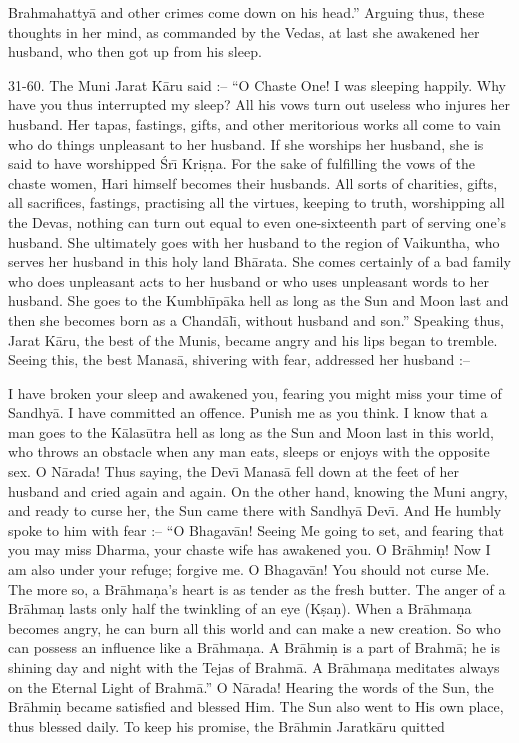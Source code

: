 Brahmahatty\=a and other crimes come down on his head.'' Arguing thus, these thoughts in her mind, as commanded by the Vedas, at last she awakened her husband, who then got up from his sleep.

31-60. The Muni Jarat K\=aru said :-- ``O Chaste One! I was sleeping happily. Why have you thus interrupted my sleep? All his vows turn out useless who injures her husband. Her tapas, fastings, gifts, and other meritorious works all come to vain who do things unpleasant to her husband. If she worships her husband, she is said to have worshipped \'Sr\={\i} Kri\d{s}\d{n}a. For the sake of fulfilling the vows of the chaste women, Hari himself becomes their husbands. All sorts of charities, gifts, all sacrifices, fastings, practising all the virtues, keeping to truth, worshipping all the Devas, nothing can turn out equal to even one-sixteenth part of serving one's husband. She ultimately goes with her husband to the region of Vaikuntha, who serves her husband in this holy land Bh\=arata. She comes certainly of a bad family who does unpleasant acts to her husband or who uses unpleasant words to her husband. She goes to the Kumbh\={\i}p\=aka hell as long as the Sun and Moon last and then she becomes born as a Chand\=al\={\i}, without husband and son.'' Speaking thus, Jarat K\=aru, the best of the Munis, became angry and his lips began to tremble. Seeing this, the best Manas\=a, shivering with fear, addressed her husband :--

I have broken your sleep and awakened you, fearing you might miss your time of Sandhy\=a. I have committed an offence. Punish me as you think. I know that a man goes to the K\=alas\=utra hell as long as the Sun and Moon last in this world, who throws an obstacle when any man eats, sleeps or enjoys with the opposite sex. O N\=arada! Thus saying, the Dev\={\i} Manas\=a fell down at the feet of her husband and cried again and again. On the other hand, knowing the Muni angry, and ready to curse her, the Sun came there with Sandhy\=a Dev\={\i}. And He humbly spoke to him with fear :-- ``O Bhagav\=an! Seeing Me going to set, and fearing that you may miss Dharma, your chaste wife has awakened you. O Br\=ahmi\d{n}! Now I am also under your refuge; forgive me. O Bhagav\=an! You should not curse Me. The more so, a Br\=ahma\d{n}a's heart is as tender as the fresh butter. The anger of a Br\=ahma\d{n} lasts only half the twinkling of an eye (K\d{s}a\d{n}). When a Br\=ahma\d{n}a becomes angry, he can burn all this world and can make a new creation. So who can possess an influence like a Br\=ahma\d{n}a. A Br\=ahmi\d{n} is a part of Brahm\=a; he is shining day and night with the Tejas of Brahm\=a. A Br\=ahma\d{n}a meditates always on the Eternal Light of Brahm\=a.'' O N\=arada! Hearing the words of the Sun, the Br\=ahmi\d{n} became satisfied and blessed Him. The Sun also went to His own place, thus blessed daily. To keep his promise, the Br\=ahmin Jaratk\=aru quitted

